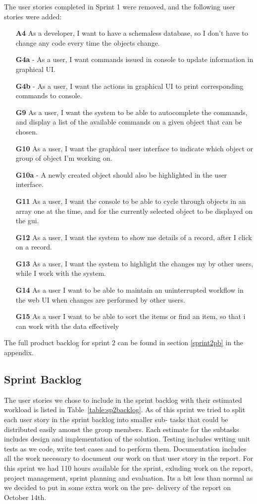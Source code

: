 The user stories completed in Sprint 1 were removed, and the following user stories were added:

\begin{itemize}
  \item [\textbf{A4}] As a developer, I want to have a schemaless database, so I don't have to change any code every time the objects change.
  \item [\textbf{G4a}] - As a user, I want commands issued in console to update information in graphical UI.
  \item [\textbf{G4b}] - As a user, I want the actions in graphical UI to print corresponding commands to console.
  \item [\textbf{G9}] As a user, I want the system to be able to autocomplete the commands, and display a list of the available commands on a given object that can be chosen.
  \item [\textbf{G10}] As a user, I want the graphical user interface to indicate which object or group of object I’m working on.
  \item [\textbf{G10a}] - A newly created object should also be highlighted in the user interface.
  \item [\textbf{G11}] As a user, I want the console to be able to cycle through objects in an array one at the time, and for the currently selected object to be displayed on the gui.
  \item [\textbf{G12}] As a user, I want the system to show me details of a record, after I click on a record.
  \item [\textbf{G13}] As a user, I want the system to highlight the changes my by other users, while I work with the system.
  \item [\textbf{G14}] As a user I want to be able to maintain an uninterrupted workflow in the web UI when changes are performed by other users.
  \item [\textbf{G15}] As a user I want to be able to sort the items or find an item, so that i can work with the data effectively
\end{itemize}

The full product backlog for sprint 2 can be found in section \ref{sprint2pb} in the appendix.

\subsection{Sprint Backlog}
The user stories we chose to include in the sprint backlog with their estimated workload is listed in Table~\ref{table:sp2backlog}. As of this sprint we tried to split each user story in the sprint backlog into smaller sub- tasks that could be distributed easily amonst the group members. Each estimate for the subtasks includes design and implementation of the solution. Testing includes writing unit tests as we code, write test cases and to perform them. Documentation includes all the work necessary to document our work on that user story in the report. For this sprint we had 110 hours available for the sprint, exluding work on the report, project management, sprint planning and evaluation. Its a bit less than normal as we decided to put in some extra work on the pre- delivery of the report on October 14th.

